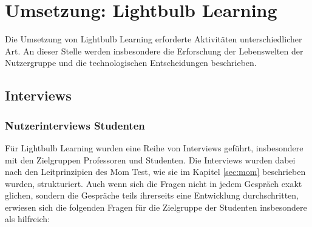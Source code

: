 \chapter{Umsetzung: Lightbulb Learning}
Die Umsetzung von Lightbulb Learning erforderte Aktivitäten unterschiedlicher Art. An dieser Stelle werden insbesondere die Erforschung der Lebenswelten der Nutzergruppe und die technologischen Entscheidungen beschrieben.

\section{Interviews}

\subsection{Nutzerinterviews Studenten}
Für Lightbulb Learning wurden eine Reihe von Interviews geführt, insbesondere mit den Zielgruppen Professoren und Studenten. Die Interviews wurden dabei nach den Leitprinzipien des Mom Test, wie sie im Kapitel \ref{sec:mom} beschrieben wurden, strukturiert. Auch wenn sich die Fragen nicht in jedem Gespräch exakt glichen, sondern die Gespräche teils ihrerseits eine Entwicklung durchschritten, erwiesen sich die folgenden Fragen für die Zielgruppe der Studenten insbesondere als hilfreich:

